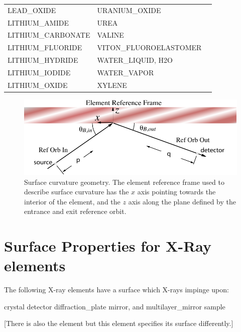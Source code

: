\begin{center}
\begin{longtable}{lll}
LEAD_OXIDE                          & URANIUM_OXIDE                             \\
LITHIUM_AMIDE                       & UREA                                      \\
LITHIUM_CARBONATE                   & VALINE                                    \\
LITHIUM_FLUORIDE                    & VITON_FLUOROELASTOMER                     \\
LITHIUM_HYDRIDE                     & WATER_LIQUID, H2O                         \\
LITHIUM_IODIDE                      & WATER_VAPOR                               \\
LITHIUM_OXIDE                       & XYLENE                                    \\
\end{longtable}
\end{center}


\begin{figure}[tb]
  \centering
  \includegraphics[width=5in]{surface-curvature.pdf}
  \caption[Surface curvature geometry.]
{Surface curvature geometry. The element reference frame used to
describe surface curvature has the $x$ axis pointing towards the
interior of the element, and the $z$ axis along the plane defined by
the entrance and exit reference orbit.}
  \label{f:surface}
\end{figure}

\section{Surface Properties for X-Ray elements}
\label{s:s.curve}

The following X-ray elements have a surface which X-rays impinge upon:
\begin{example}
  crystal               
  detector              
  diffraction_plate     
  mirror, and           
  multilayer_mirror     
  sample                
\end{example}
[There is also the  element but this element specifies
its surface differently.]

